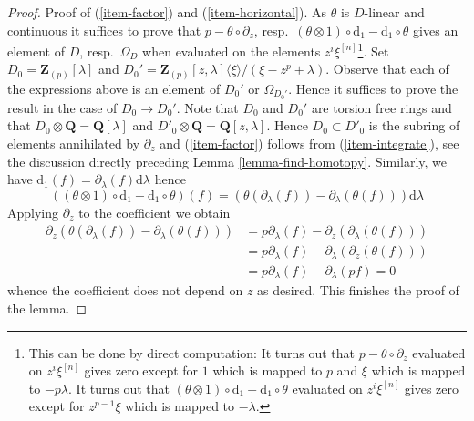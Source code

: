 \begin{proof}
\medskip\noindent
Proof of (\ref{item-factor}) and (\ref{item-horizontal}).
As $\theta$ is $D$-linear and continuous it suffices to prove that
$p - \theta \circ \partial_z$,
resp.\ $(\theta \otimes 1) \circ \text{d}_1 - \text{d}_1 \circ \theta$
gives an element of $D$, resp.\ $\Omega_D$ when evaluated on the
elements $z^i\xi^{[n]}$\footnote{This can be done by direct computation:
It turns out that $p - \theta \circ \partial_z$ evaluated on
$z^i\xi^{[n]}$ gives zero except for $1$ which is mapped to $p$ and
$\xi$ which is mapped to $-p\lambda$. It turns out that 
$(\theta \otimes 1) \circ \text{d}_1 - \text{d}_1 \circ \theta$
evaluated on $z^i\xi^{[n]}$ gives zero except for $z^{p - 1}\xi$
which is mapped to $-\lambda$.}.
Set $D_0 = \mathbf{Z}_{(p)}[\lambda]$ and
$D_0' = \mathbf{Z}_{(p)}[z, \lambda]\langle \xi \rangle/(\xi - z^p + \lambda)$.
Observe that each of the expressions above is an element of
$D_0'$ or $\Omega_{D_0'}$. Hence it suffices to prove the result
in the case of $D_0 \to D_0'$. Note that $D_0$ and $D_0'$
are torsion free rings and that $D_0 \otimes \mathbf{Q} = \mathbf{Q}[\lambda]$
and $D'_0 \otimes \mathbf{Q} = \mathbf{Q}[z, \lambda]$.
Hence $D_0 \subset D'_0$ is the subring of elements annihilated
by $\partial_z$ and (\ref{item-factor})
follows from (\ref{item-integrate}), see the discussion directly preceding
Lemma \ref{lemma-find-homotopy}. Similarly, we have
$\text{d}_1(f) = \partial_\lambda(f)\text{d}\lambda$ hence
$$
\left((\theta \otimes 1) \circ \text{d}_1 - \text{d}_1 \circ \theta\right)(f)
=
\left(\theta(\partial_\lambda(f)) - \partial_\lambda(\theta(f))\right)
\text{d}\lambda
$$
Applying $\partial_z$ to the coefficient we obtain
\begin{align*}
\partial_z\left(
\theta(\partial_\lambda(f)) - \partial_\lambda(\theta(f))
\right)
& =
p \partial_\lambda(f) - \partial_z(\partial_\lambda(\theta(f))) \\
& =
p \partial_\lambda(f) - \partial_\lambda(\partial_z(\theta(f))) \\
& =
p \partial_\lambda(f) - \partial_\lambda(p f) = 0
\end{align*}
whence the coefficient does not depend on $z$ as desired.
This finishes the proof of the lemma.
\end{proof}